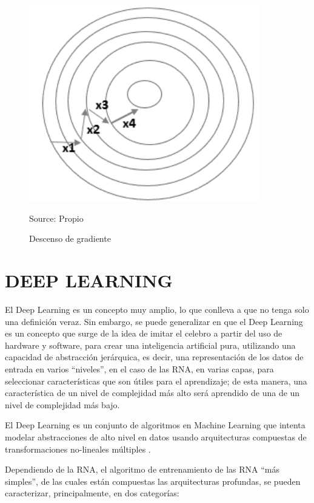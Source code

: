 \begin{figure}[H]
		\centering
		\includegraphics[width=100mm]{./Imagenes/back_propagation.png}
		\caption{Descenso de gradiente}
		Source: Propio
		\label{fig:back_propagation}
\end{figure}


\section{DEEP LEARNING}
El Deep Learning es un concepto muy amplio, lo que conlleva a que no tenga solo
una definición veraz. Sin embargo, se puede generalizar en que el Deep Learning es un
concepto que surge de la idea de imitar el celebro a partir del uso de hardware y software,
para crear una inteligencia artificial pura, utilizando una capacidad de abstracción
jerárquica, es decir, una representación de los datos de entrada en varios “niveles”, en el
caso de las RNA, en varias capas, para seleccionar características que son útiles para el
aprendizaje; de esta manera, una característica de un nivel de complejidad más alto será
aprendido de una de un nivel de complejidad más bajo.

El Deep Learning es un conjunto de algoritmos en Machine Learning que intenta
modelar abstracciones de alto nivel en datos usando arquitecturas compuestas de
transformaciones no-lineales múltiples \cite{17bengio2013representation}.

Dependiendo de la RNA, el algoritmo de entrenamiento de las RNA “más
simples”, de las cuales están compuestas las arquitecturas profundas, se pueden
caracterizar, principalmente, en dos categorías:

